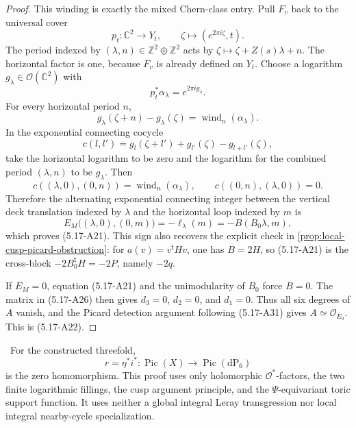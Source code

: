 \begin{proof}
This winding is exactly the mixed Chern-class entry.  Pull \(F_v\) back to
the universal cover
\[
 p_t:\mathbb C^2\longrightarrow Y_t,
 \qquad \zeta\longmapsto(e^{2\pi i\zeta},t).
\]
The period indexed by \((\lambda,n)\in\mathbb Z^2\oplus\mathbb Z^2\)
acts by \(\zeta\mapsto\zeta+Z(s)\lambda+n\).  The horizontal factor is one,
because \(F_v\) is already defined on \(Y_t\).  Choose a logarithm
\(g_\lambda\in\mathcal O(\mathbb C^2)\) with
\[
 p_t^*\alpha_\lambda=e^{2\pi i g_\lambda}.
\]
For every horizontal period \(n\),
\[
 g_\lambda(\zeta+n)-g_\lambda(\zeta)
 =\operatorname{wind}_n(\alpha_\lambda).
\]
In the exponential connecting cocycle
\[
 c(l,l')=g_l(\zeta+l')+g_{l'}(\zeta)-g_{l+l'}(\zeta),
\]
take the horizontal logarithm to be zero and the logarithm for the combined
period \((\lambda,n)\) to be \(g_\lambda\).  Then
\[
 c((\lambda,0),(0,n))
 =\operatorname{wind}_n(\alpha_\lambda),
 \qquad
 c((0,n),(\lambda,0))=0.
\]
Therefore the alternating exponential connecting integer between
the vertical deck
translation indexed by \(\lambda\) and the horizontal loop indexed by
\(m\) is
\[
 E_M\bigl((\lambda,0),(0,m)\bigr)
 =-\ell_\lambda(m)
 =-B(B_0\lambda,m),
\]
which proves (5.17-A21).  This sign also recovers the explicit check in
\cref{prop:local-cusp-picard-obstruction}: for
\(a(v)=v^{\mathsf t}Hv\), one has \(B=2H\), so (5.17-A21) is the
cross-block \(-2B_0^{\mathsf t}H=-2P\), namely \(-2q\).

If \(E_M=0\), equation (5.17-A21) and the unimodularity of \(B_0\) force
\(B=0\).  The matrix in (5.17-A26) then gives
\(d_3=0\), \(d_2=0\), and \(d_1=0\).  Thus all six degrees of \(A\)
vanish, and the Picard detection argument following (5.17-A31) gives
\(A\simeq\mathcal O_{E_0}\).  This is (5.17-A22).
\end{proof}

\begin{theorem}
\label{thm:analytic-all-picard}
\Verified\ For the constructed threefold,
\[
 r=\eta^*i^*:\operatorname{Pic}(X)\longrightarrow
 \operatorname{Pic}(\mathrm{dP}_6)
\]
is the zero homomorphism.  This proof uses only holomorphic
\(\mathcal O^*\)-factors, the two finite logarithmic fillings, the cusp
argument principle, and the \(\Psi\)-equivariant toric support function.
It uses neither a global integral Leray transgression nor local integral
nearby-cycle specialization.
\end{theorem}

